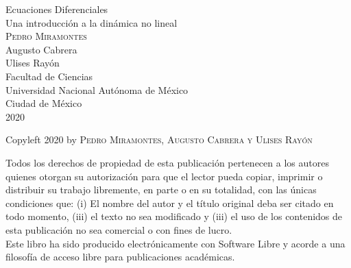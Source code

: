 \documentclass[letterpaper,12pt,twoside]{book}
\begin{document}

\thispagestyle{empty}
\vspace{20 mm}
\begin{center}
\Huge
Ecuaciones Diferenciales\\
\Large Una introducción a la dinámica no lineal\\
      
\Large
\vspace{15mm}
\textsc{Pedro Miramontes}\\
Augusto Cabrera\\
Ulises Rayón\\
\Large
\large
Facultad de Ciencias\\
Universidad Nacional Aut\'onoma de M\'exico\\
\vspace{90 mm}
Ciudad de M\'exico\hspace{1mm}  \\
  
2020\\
\normalsize

\pagebreak
\thispagestyle{empty}
\vspace{20 mm}

 
\vspace{5 mm}
\large
Copyleft 2020 by \textsc{Pedro Miramontes, Augusto Cabrera y Ulises Rayón}\\
\normalsize
\vspace{10 mm}

\vspace{10 mm}
Todos los derechos de propiedad de esta publicaci\'on pertenecen a los autores
quienes otorgan su autorizaci\'on para que el lector pueda copiar,
imprimir o distribuir su trabajo libremente, en parte o en su totalidad, con las
\'unicas condiciones que: (i) El nombre del autor y el t\'itulo original deba ser citado en todo
momento, (iii) el texto no sea modificado y (iii) el uso de los
contenidos de esta publicaci\'on no sea comercial o con fines de lucro.\\



\vspace{60 mm}
Este libro ha sido producido electr\'onicamente con Software Libre
y acorde a una filosof\'ia de acceso libre para publicaciones acad\'emicas.
\end{center}

\newpage


\newpage
\end{document}
